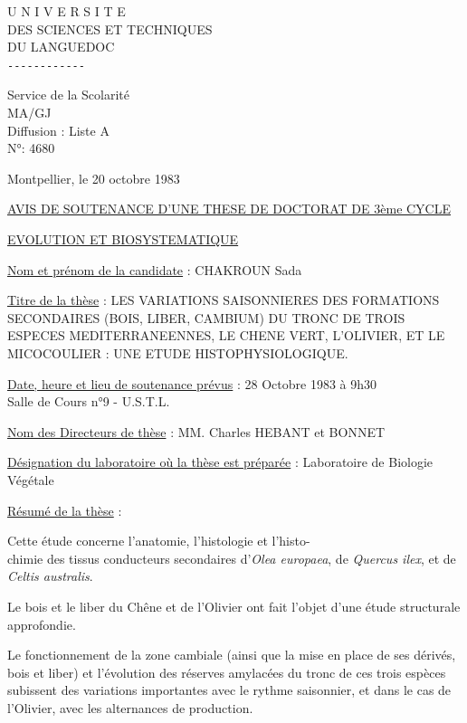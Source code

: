 

\noindent
\begin{minipage}[t]{.43\linewidth}
\centering\small
U N I V E R S I T E\\
DES SCIENCES ET TECHNIQUES\\
DU LANGUEDOC\\
\texttt{-{}-{}-{}-{}-{}-{}-{}-{}-{}-{}-{}-}

Service de la Scolarité\\
MA/GJ\\
Diffusion : Liste A\\
N°: 4680
\end{minipage}\hfill
\begin{minipage}[t]{.53\linewidth}
\small\vspace{2\baselineskip}
Montpellier, le 20 octobre 1983
\end{minipage}

\begin{center}
\uline{AVIS DE SOUTENANCE D'UNE THESE DE DOCTORAT DE 3ème CYCLE}

\uline{EVOLUTION ET BIOSYSTEMATIQUE}
\end{center}

\uline{Nom et prénom de la candidate} : CHAKROUN Sada

\uline{Titre de la thèse} : LES VARIATIONS SAISONNIERES DES FORMATIONS SECONDAIRES (BOIS, LIBER, CAMBIUM) DU TRONC DE TROIS ESPECES MEDITERRANEENNES, LE CHENE VERT, L'OLIVIER, ET LE MICOCOULIER : UNE ETUDE HISTOPHYSIOLOGIQUE.

\uline{Date, heure et lieu de soutenance prévus} : 28 Octobre 1983 à 9h30\\
Salle de Cours n°9 - U.S.T.L.

\uline{Nom des Directeurs de thèse} : MM. Charles HEBANT et BONNET

\uline{Désignation du laboratoire où la thèse est préparée} : Laboratoire de Biologie Végétale

\uline{Résumé de la thèse} :

Cette étude concerne l'anatomie, l'histologie et l'histo-\\
chimie des tissus conducteurs secondaires d'\textit{Olea europaea}, de \textit{Quercus ilex}, et de \textit{Celtis australis}.

Le bois et le liber du Chêne et de l'Olivier ont fait l'objet d'une étude structurale approfondie.

Le fonctionnement de la zone cambiale (ainsi que la mise en place de ses dérivés, bois et liber) et l'évolution des réserves amylacées du tronc de ces trois espèces subissent des variations importantes avec le rythme saisonnier, et dans le cas de l'Olivier, avec les alternances de production.

